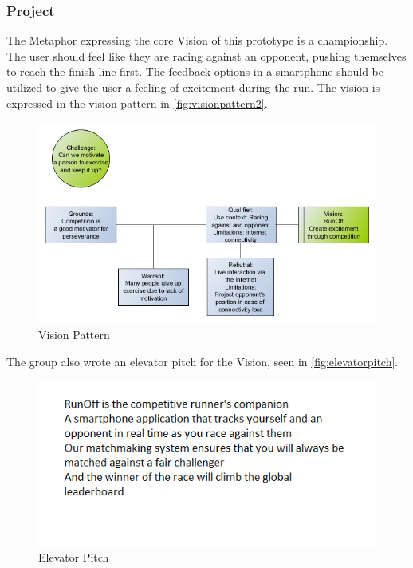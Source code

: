 \subsubsection{Project}
The Metaphor expressing the core Vision of this prototype is a championship. The user should feel like they are racing against an opponent, pushing themselves to reach the finish line first. The feedback options in a smartphone should be utilized to give the user a feeling of excitement during the run. The vision is expressed in the vision pattern in \autoref{fig:visionpattern2}.

\begin{figure}[!ht]
	\begin{center}
		\includegraphics[scale=0.5]{img/visionpattern2.png}
		\caption{Vision Pattern}
		\label{fig:visionpattern2}
	\end{center}
\end{figure}

The group also wrote an elevator pitch for the Vision, seen in \autoref{fig:elevatorpitch}.

\begin{figure}[!ht]
	\begin{center}
		\includegraphics[scale=0.5]{img/elevatorpitch.png}
		\caption{Elevator Pitch}
		\label{fig:elevatorpitch}
	\end{center}
\end{figure}

